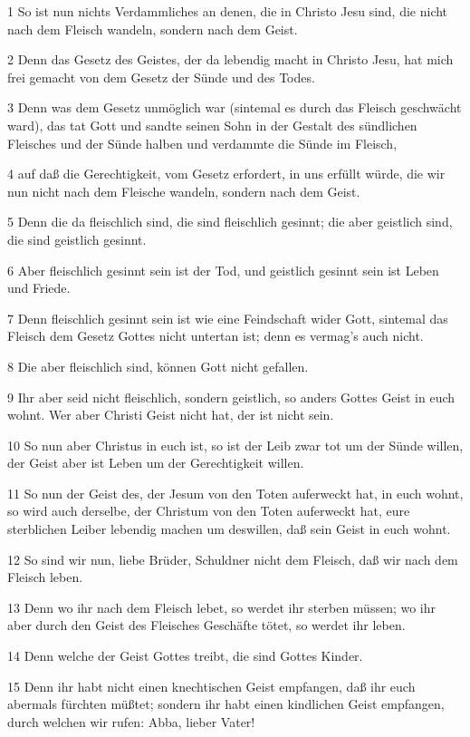 \par 1 So ist nun nichts Verdammliches an denen, die in Christo Jesu sind, die nicht nach dem Fleisch wandeln, sondern nach dem Geist.
\par 2 Denn das Gesetz des Geistes, der da lebendig macht in Christo Jesu, hat mich frei gemacht von dem Gesetz der Sünde und des Todes.
\par 3 Denn was dem Gesetz unmöglich war (sintemal es durch das Fleisch geschwächt ward), das tat Gott und sandte seinen Sohn in der Gestalt des sündlichen Fleisches und der Sünde halben und verdammte die Sünde im Fleisch,
\par 4 auf daß die Gerechtigkeit, vom Gesetz erfordert, in uns erfüllt würde, die wir nun nicht nach dem Fleische wandeln, sondern nach dem Geist.
\par 5 Denn die da fleischlich sind, die sind fleischlich gesinnt; die aber geistlich sind, die sind geistlich gesinnt.
\par 6 Aber fleischlich gesinnt sein ist der Tod, und geistlich gesinnt sein ist Leben und Friede.
\par 7 Denn fleischlich gesinnt sein ist wie eine Feindschaft wider Gott, sintemal das Fleisch dem Gesetz Gottes nicht untertan ist; denn es vermag's auch nicht.
\par 8 Die aber fleischlich sind, können Gott nicht gefallen.
\par 9 Ihr aber seid nicht fleischlich, sondern geistlich, so anders Gottes Geist in euch wohnt. Wer aber Christi Geist nicht hat, der ist nicht sein.
\par 10 So nun aber Christus in euch ist, so ist der Leib zwar tot um der Sünde willen, der Geist aber ist Leben um der Gerechtigkeit willen.
\par 11 So nun der Geist des, der Jesum von den Toten auferweckt hat, in euch wohnt, so wird auch derselbe, der Christum von den Toten auferweckt hat, eure sterblichen Leiber lebendig machen um deswillen, daß sein Geist in euch wohnt.
\par 12 So sind wir nun, liebe Brüder, Schuldner nicht dem Fleisch, daß wir nach dem Fleisch leben.
\par 13 Denn wo ihr nach dem Fleisch lebet, so werdet ihr sterben müssen; wo ihr aber durch den Geist des Fleisches Geschäfte tötet, so werdet ihr leben.
\par 14 Denn welche der Geist Gottes treibt, die sind Gottes Kinder.
\par 15 Denn ihr habt nicht einen knechtischen Geist empfangen, daß ihr euch abermals fürchten müßtet; sondern ihr habt einen kindlichen Geist empfangen, durch welchen wir rufen: Abba, lieber Vater!
